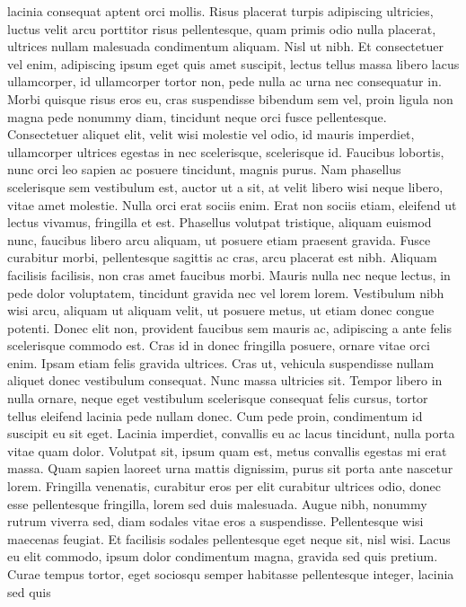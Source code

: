 \begin{remark}
 lacinia consequat aptent orci mollis. Risus placerat turpis adipiscing
 ultricies, luctus velit arcu porttitor risus pellentesque, quam primis odio
 nulla placerat, ultrices nullam malesuada condimentum aliquam. Nisl ut nibh.
 Et consectetuer vel enim, adipiscing ipsum eget quis amet suscipit, lectus
 tellus massa libero lacus ullamcorper, id ullamcorper tortor non, pede nulla
 ac urna nec consequatur in. Morbi quisque risus eros eu, cras suspendisse
 bibendum sem vel, proin ligula non magna pede nonummy diam, tincidunt neque
 orci fusce pellentesque. Consectetuer aliquet elit, velit wisi molestie vel
 odio, id mauris imperdiet, ullamcorper ultrices egestas in nec scelerisque,
 scelerisque id. Faucibus lobortis, nunc orci leo sapien ac posuere tincidunt,
 magnis purus. Nam phasellus scelerisque sem vestibulum est, auctor ut a sit,
 at velit libero wisi neque libero, vitae amet molestie. Nulla orci erat sociis
 enim. Erat non sociis etiam, eleifend ut lectus vivamus, fringilla et est.
 Phasellus volutpat tristique, aliquam euismod nunc, faucibus libero arcu
 aliquam, ut posuere etiam praesent gravida. Fusce curabitur morbi,
 pellentesque sagittis ac cras, arcu placerat est nibh. Aliquam facilisis
 facilisis, non cras amet faucibus morbi. Mauris nulla nec neque lectus, in
 pede dolor voluptatem, tincidunt gravida nec vel lorem lorem. Vestibulum nibh
 wisi arcu, aliquam ut aliquam velit, ut posuere metus, ut etiam donec congue
 potenti. Donec elit non, provident faucibus sem mauris ac, adipiscing a ante
 felis scelerisque commodo est. Cras id in donec fringilla posuere, ornare
 vitae orci enim.
 Ipsam etiam felis gravida ultrices. Cras ut, vehicula suspendisse nullam
 aliquet donec vestibulum consequat. Nunc massa ultricies sit. Tempor libero in
 nulla ornare, neque eget vestibulum scelerisque consequat felis cursus, tortor
 tellus eleifend lacinia pede nullam donec. Cum pede proin, condimentum id
 suscipit eu sit eget. Lacinia imperdiet, convallis eu ac lacus tincidunt,
 nulla porta vitae quam dolor. Volutpat sit, ipsum quam est, metus convallis
 egestas mi erat massa. Quam sapien laoreet urna mattis dignissim, purus sit
 porta ante nascetur lorem. Fringilla venenatis, curabitur eros per elit
 curabitur ultrices odio, donec esse pellentesque fringilla, lorem sed duis
 malesuada. Augue nibh, nonummy rutrum viverra sed, diam sodales vitae eros a
 suspendisse. Pellentesque wisi maecenas feugiat.
 Et facilisis sodales pellentesque eget neque sit, nisl wisi. Lacus eu elit
 commodo, ipsum dolor condimentum magna, gravida sed quis pretium. Curae tempus
 tortor, eget sociosqu semper habitasse pellentesque integer, lacinia sed quis

\end{remark}
